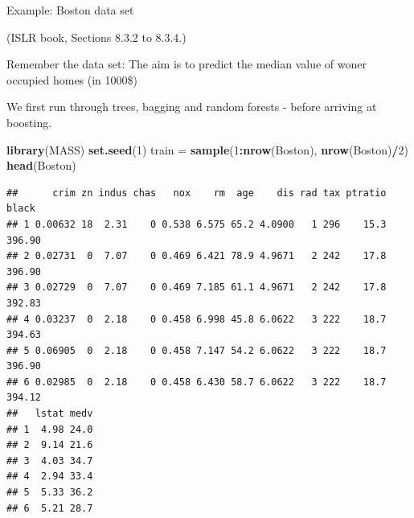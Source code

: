 \documentclass[10pt,ignorenonframetext,]{beamer}
\newenvironment{Shaded}{\begin{snugshade}}{\end{snugshade}}
\newcommand{\KeywordTok}[1]{\textcolor[rgb]{0.13,0.29,0.53}{\textbf{#1}}}
\newcommand{\DecValTok}[1]{\textcolor[rgb]{0.00,0.00,0.81}{#1}}
\newcommand{\StringTok}[1]{\textcolor[rgb]{0.31,0.60,0.02}{#1}}
\newcommand{\OperatorTok}[1]{\textcolor[rgb]{0.81,0.36,0.00}{\textbf{#1}}}
\newcommand{\NormalTok}[1]{#1}
\begin{document}
\begin{frame}[fragile]{Example: Boston data set}

\tiny
(ISLR book, Sections 8.3.2 to 8.3.4.)

\normalsize
Remember the data set: The aim is to predict the median value of woner
occupied homes (in 1000\$)

We first run through trees, bagging and random forests - before arriving
at boosting.

\scriptsize

\begin{Shaded}
\begin{Highlighting}[]
\KeywordTok{library}\NormalTok{(MASS)}
\KeywordTok{set.seed}\NormalTok{(}\DecValTok{1}\NormalTok{)}
\NormalTok{train =}\StringTok{ }\KeywordTok{sample}\NormalTok{(}\DecValTok{1}\OperatorTok{:}\KeywordTok{nrow}\NormalTok{(Boston), }\KeywordTok{nrow}\NormalTok{(Boston)}\OperatorTok{/}\DecValTok{2}\NormalTok{)}
\KeywordTok{head}\NormalTok{(Boston)}
\end{Highlighting}
\end{Shaded}

\begin{verbatim}
##      crim zn indus chas   nox    rm  age    dis rad tax ptratio  black
## 1 0.00632 18  2.31    0 0.538 6.575 65.2 4.0900   1 296    15.3 396.90
## 2 0.02731  0  7.07    0 0.469 6.421 78.9 4.9671   2 242    17.8 396.90
## 3 0.02729  0  7.07    0 0.469 7.185 61.1 4.9671   2 242    17.8 392.83
## 4 0.03237  0  2.18    0 0.458 6.998 45.8 6.0622   3 222    18.7 394.63
## 5 0.06905  0  2.18    0 0.458 7.147 54.2 6.0622   3 222    18.7 396.90
## 6 0.02985  0  2.18    0 0.458 6.430 58.7 6.0622   3 222    18.7 394.12
##   lstat medv
## 1  4.98 24.0
## 2  9.14 21.6
## 3  4.03 34.7
## 4  2.94 33.4
## 5  5.33 36.2
## 6  5.21 28.7
\end{verbatim}

\end{frame}
\end{document}
